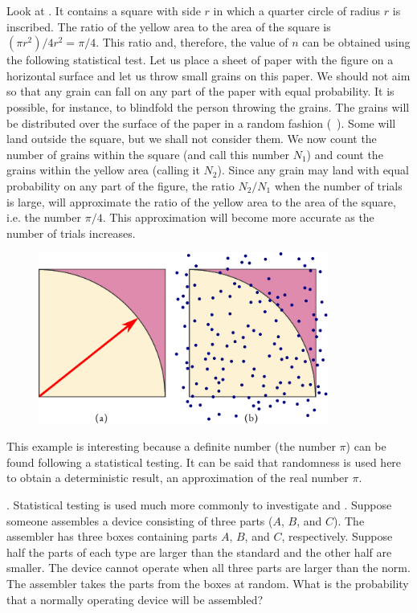  Look at . It contains a square with side $r$ in which a quarter circle of radius $r$ is inscribed. The ratio of the yellow area to the area of the square is $(\pi r^{2})/4r^{2} = \pi /4$. This ratio and, therefore, the value of $n$ can be obtained using the following statistical test. Let us place a sheet of paper with the figure on a horizontal surface and let us throw small grains on this paper. We should not aim so that any grain
can fall on any part of the paper with equal probability. It is possible,
for instance, to blindfold the person throwing the grains. The grains will
be distributed over the surface of the paper in a random fashion
(~). Some will land outside the square, but we shall not consider them. We now count the number of grains within the square (and call
this number $N_{1}$) and count the grains within the yellow area (calling it
$N_{2}$). Since any grain may land with equal probability on any part of the
figure, the ratio $N_{2}/N_{1}$ when the number of trials is large, will
approximate the ratio of the yellow area to the area of the square, i.e.
the number $\pi /4$. This approximation will become more accurate as the
number of trials increases.
 \begin{figure}[!h]
 \centering
 \includegraphics[width=0.85\textwidth]{figures/monte-carlo1.pdf}
 \end{figure}
This example is interesting because a definite number (the number $\pi$)
can be found following a statistical testing. It can be said that
randomness is used here to obtain a deterministic result, an
approximation of the real number $\pi$.


. Statistical testing is used much more commonly to
investigate  and . Suppose someone
assembles a device consisting of three parts ($A$, $B$, and $C$). The assembler
has three boxes containing parts $A$, $B$, and $C$, respectively. Suppose half
the parts of each type are larger than the standard and the other half
are smaller. The device cannot operate when all three parts are larger
than the norm. The assembler takes the parts from the boxes at random.
What is the probability that a normally operating device will be
assembled?

